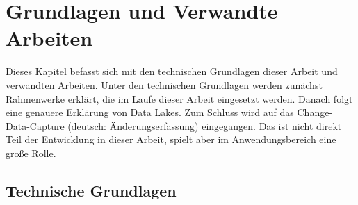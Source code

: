 \chapter{Grundlagen und Verwandte Arbeiten}

Dieses Kapitel befasst sich mit den technischen Grundlagen dieser Arbeit und verwandten Arbeiten.
Unter den technischen Grundlagen werden zunächst Rahmenwerke erklärt, die im Laufe dieser Arbeit eingesetzt werden.
Danach folgt eine genauere Erklärung von Data Lakes.
Zum Schluss wird auf das Change-Data-Capture (deutsch: Änderungserfassung) eingegangen.
Das ist nicht direkt Teil der Entwicklung in dieser Arbeit, spielt aber im Anwendungsbereich eine große Rolle.

\section{Technische Grundlagen}






